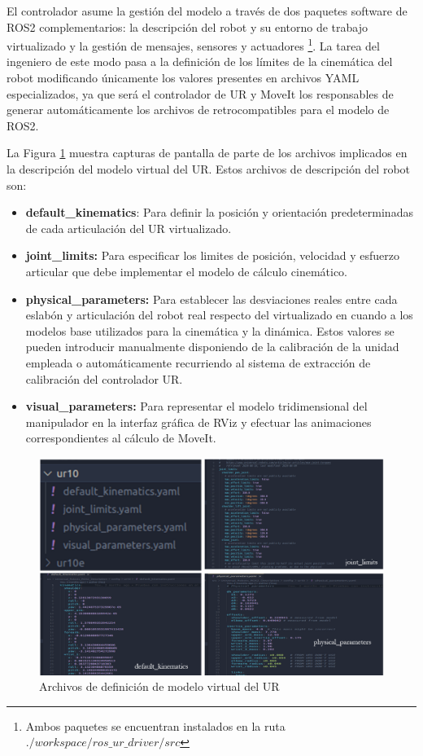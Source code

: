 El controlador asume la gestión del modelo a través de dos paquetes software de ROS2 complementarios: la descripción del robot y su entorno de trabajo virtualizado y la gestión de mensajes, sensores y actuadores \footnote{Ambos paquetes se encuentran instalados en la ruta \textit{$./workspace/ros\_ur\_driver/src$}}. La tarea del ingeniero de este modo pasa a la definición de los límites de la cinemática del robot modificando únicamente los valores presentes en archivos \acrshort{YAML} especializados, ya que será el controlador de UR y MoveIt los responsables de generar automáticamente los archivos de retrocompatibles para el modelo de ROS2.

La Figura \ref{fig: archivos modelo virtual UR} muestra capturas de pantalla de parte de los archivos implicados en la descripción del modelo virtual del UR. Estos archivos de descripción del robot son:

\begin{itemize}
    \item \textbf{default\_kinematics}: Para definir la posición y orientación predeterminadas de cada articulación del UR virtualizado.
    \item \textbf{joint\_limits:} Para especificar los limites de posición, velocidad y esfuerzo articular que debe implementar el modelo de cálculo cinemático.
    \item \textbf{physical\_parameters:} Para establecer las desviaciones reales entre cada eslabón y articulación del robot real respecto del virtualizado en cuando a los modelos base utilizados para la cinemática y la dinámica. Estos valores se pueden introducir manualmente disponiendo de la calibración de la unidad empleada o automáticamente recurriendo al sistema de extracción de calibración del controlador UR.
    \item \textbf{visual\_parameters:} Para representar el modelo tridimensional del manipulador en la interfaz gráfica de RViz y efectuar las animaciones correspondientes al cálculo de MoveIt.
\end{itemize} 

\begin{figure}[h!]
    \centering
    \includegraphics[scale=0.5]{figuras/archivos_modelo_virtual_UR.png}
    \caption{Archivos de definición de modelo virtual del UR}
    \label{fig: archivos modelo virtual UR}
\end{figure}

